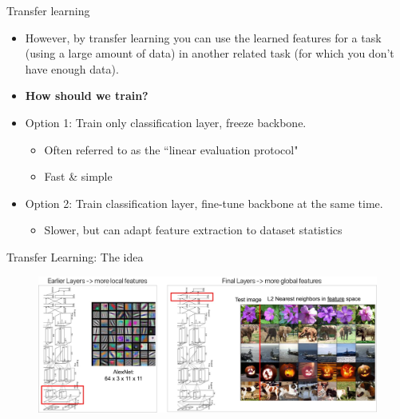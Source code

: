 \documentclass[serif, aspectratio=169]{beamer}
\begin{document}
\begin{frame}{Transfer learning}
	\begin{itemize}
		\item However, by transfer learning you can use the learned features for a task (using a large amount of data) in another related task (for which you don't have enough data).
		\item \textbf{How should we train?}
		\item Option 1: Train only classification layer, freeze backbone.

		\begin{itemize}
			\item Often referred to as the ``linear evaluation protocol"
			\item Fast \& simple
		\end{itemize}
		\item Option 2: Train classification layer, fine-tune backbone at the same time.

		\begin{itemize}
			\item Slower, but can adapt feature extraction to dataset statistics
		\end{itemize}
	\end{itemize}
\end{frame}

\begin{frame}{Transfer Learning: The idea}
	\vspace{-1em}
	\begin{figure}[htpb]
		\begin{center}
			\includegraphics[keepaspectratio, scale=0.23]{pic/TL_alexnet}
		\end{center}
	\end{figure}
\end{frame}
\end{document}
